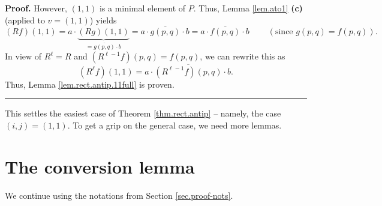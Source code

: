 \documentclass[numbers=enddot,12pt,final,onecolumn,notitlepage]{scrartcl}%
\theoremstyle{definition}
\newenvironment{verlong}{}{}
\newenvironment{proof}[1][Proof]{\noindent\textbf{#1.} }{\ \rule{0.5em}{0.5em}}
\begin{document}
\begin{verlong}
\begin{proof}
However, $\left(  1,1\right)  $ is a minimal element of $P$. Thus, Lemma
\ref{lem.ato1} \textbf{(c)} (applied to $v=\left(  1,1\right)  $) yields
\[
\left(  Rf\right)  \left(  1,1\right)  =a\cdot\underbrace{\left(  Rg\right)
\left(  1,1\right)  }_{=\overline{g\left(  p,q\right)  }\cdot b}%
=a\cdot\overline{g\left(  p,q\right)  }\cdot b=a\cdot\overline{f\left(
p,q\right)  }\cdot b\ \ \ \ \ \ \ \ \ \ \left(  \text{since }g\left(
p,q\right)  =f\left(  p,q\right)  \right)  .
\]
In view of $R^{\ell}=R$ and $\left(  R^{\ell-1}f\right)  \left(  p,q\right)
=f\left(  p,q\right)  $, we can rewrite this as%
\[
\left(  R^{\ell}f\right)  \left(  1,1\right)  =a\cdot\overline{\left(
R^{\ell-1}f\right)  \left(  p,q\right)  }\cdot b.
\]
Thus, Lemma \ref{lem.rect.antip.11full} is proven.
\end{proof}
\end{verlong}

This settles the easiest case of Theorem \ref{thm.rect.antip} -- namely, the
case $\left(  i,j\right)  =\left(  1,1\right)  $. To get a grip on the general
case, we need more lemmas.

\section{\label{sec.conversion}The conversion lemma}

We continue using the notations from Section \ref{sec.proof-nots}.

\end{document}
